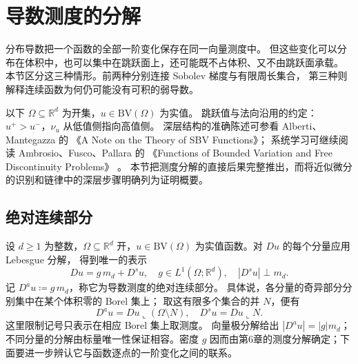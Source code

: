 \section{导数测度的分解}
\label{b1:sec:2803}

分布导数把一个函数的全部一阶变化保存在同一向量测度中。
但这些变化可以分布在体积中，也可以集中在跳跃面上，还可能既不占体积、又不由跳跃面承载。
本节区分这三种情形。前两种分别连接 Sobolev 梯度与有限周长集合，
第三种则解释连续函数为何仍可能没有可积的弱导数。

\ProseParagraphBreak

以下 \(\Omega\subseteq\mathbb R^d\) 为开集，\(u\in \mathrm{BV}(\Omega)\) 为实值。
跳跃值与法向沿用的约定：
\(u^+>u^-\)，\(\nu_u\) 从低值侧指向高值侧。
深层结构的准确陈述可参看 Alberti、Mantegazza 的
《A Note on the Theory of SBV Functions》\cite[Remark 1.2]{AlbertiMantegazza1997SBV}；
系统学习可继续阅读 Ambrosio、Fusco、Pallara 的
《Functions of Bounded Variation and Free Discontinuity Problems》%
\cite[Chapter 3]{Ambrosio2000Functions}。
本节把测度分解的直接后果完整推出，而将近似微分的识别和链律中的深层步骤明确列为证明概要。

\subsection{绝对连续部分}
\label{b1:subsec:280301}

设 \(d\ge1\) 为整数，\(\Omega\subseteq\mathbb R^d\) 开，\(u\in\mathrm{BV}(\Omega)\) 为实值函数。对 \(Du\) 的每个分量应用 Lebesgue 分解，
得到唯一的表示
\begin{equation}\label{b1:eq:bv-lebesgue-decomposition}
 Du=g\,m_d+D^su,\quad g\in L^1(\Omega;\mathbb R^d),\quad
 |D^su|\perp m_d.
\end{equation}
记 \(D^au\coloneqq g\,m_d\)，称它为导数测度的绝对连续部分。
具体说，各分量的奇异部分分别集中在某个体积零的 Borel 集上；
取这有限多个集合的并 \(N\)，便有
\[
 D^au=Du\mathbin{\llcorner}(\Omega\setminus N),
 \quad
 D^su=Du\mathbin{\llcorner}N.
\]
这里限制记号只表示在相应 Borel 集上取测度。
向量极分解给出 \(|D^au|=|g|m_d\)；
不同分量的分解由标量唯一性保证相容。密度 \(g\) 因而由第6章的测度分解确定；下面要进一步辨认它与函数逐点的一阶变化之间的联系。

